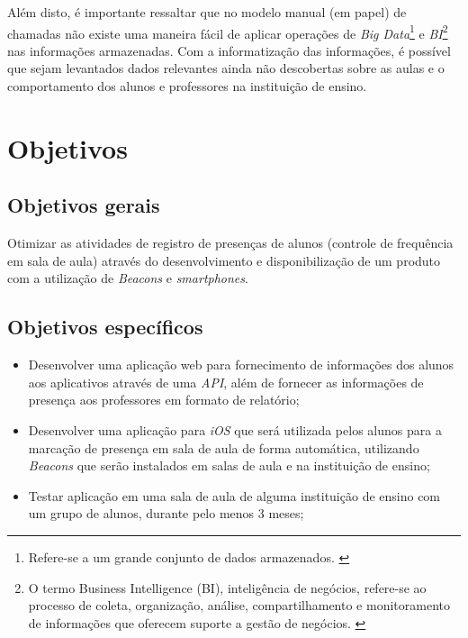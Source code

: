 \documentclass[
	12pt,
	oneside,
	a4paper,
	english,
	brazil,
]{abntex2}
\begin{document}
Além disto, é importante ressaltar que no modelo manual (em papel) de chamadas não existe uma maneira fácil de aplicar operações de \emph{Big Data}\footnote{Refere-se a um grande conjunto de dados armazenados. \cite{bigdata-wikipedia}} e \emph{BI}\footnote{O termo Business Intelligence (BI), inteligência de negócios, refere-se ao processo de coleta, organização, análise, compartilhamento e monitoramento de informações que oferecem suporte a gestão de negócios. \cite{bi-mean}} nas informações armazenadas. Com a informatização das informações, é possível que sejam levantados dados relevantes ainda não descobertas sobre as aulas e o comportamento dos alunos e professores na instituição de ensino.



\chapter{Objetivos}

\section{Objetivos gerais}
Otimizar as atividades de registro de presenças de alunos (controle de frequência em sala de aula) através do desenvolvimento e disponibilização de um produto com a utilização de \emph{Beacons} e \emph{smartphones}.

\section{Objetivos específicos}
\begin{itemize}
  \item Desenvolver uma aplicação web para fornecimento de informações dos alunos aos aplicativos através de uma \emph{API}, além de fornecer as informações de presença aos professores em formato de relatório;
  \item Desenvolver uma aplicação para \emph{iOS} que será utilizada pelos alunos para a marcação de presença em sala de aula de forma automática, utilizando \emph{Beacons} que serão instalados em salas de aula e na instituição de ensino;
  \item Testar aplicação em uma sala de aula de alguma instituição de ensino com um grupo de alunos, durante pelo menos 3 meses;
\end{itemize}
\end{document}
